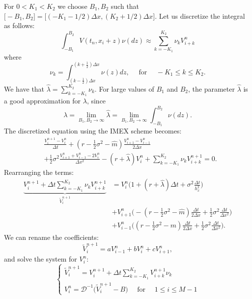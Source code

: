 For $0 < K_1 < K_2$ we choose $B_1,B_2$ such that $ \bigl[-B_1,B_2\bigr] = \bigl[ ( -K_1-1/2 )\Delta x , ( K_2+1/2 )\Delta x \bigr] $.
Let us discretize the integral as follows:
\begin{equation}\label{trap_quad}
 \int_{-B_1}^{B_2}  V(t_n,x_i+z) \nu(dz) \approx \sum_{k = -K_1}^{K_2} \nu_k V^{n}_{i+k}
\end{equation}
where
\begin{equation}\label{nu1}
 \nu_k = \int_{(k-\frac{1}{2}) \Delta x}^{(k+\frac{1}{2}) \Delta x} \nu(z) dz, \hspace{1em} \mbox{ for } \hspace{1em} -K_1 \leq k \leq K_2. 
\end{equation}
We have that $ \hat \lambda = \sum_{k = -K_1}^{K_2} \nu_k $. For large values of $B_1$ and $B_2$, the parameter $\hat \lambda$ is a good approximation for $\lambda$, since
$$\lambda = \lim_{B_1,B_2 \to \infty} \hat \lambda = \lim_{B_1,B_2 \to \infty} \int_{-B_1}^{B_2} \nu(dz).$$
The discretized equation using the IMEX scheme becomes: 
\begin{align}
&\frac{V^{n+1}_{i} -V^{n}_{i}}{\Delta t} + 
(r-\frac{1}{2}\sigma^2 - \hat m) \frac{V^{n}_{i+1} -V^{n}_{i-1}}{ 2 \Delta x} \\ \nonumber
&+ \frac{1}{2} \sigma^2 \frac{V^{n}_{i+1} + V^{n}_{i-1} - 2 V^{n}_{i}}{\Delta x^2}  - (r+\hat \lambda) V^{n}_i +\sum_{k = -K_1}^{K_2} \nu_k V^{n+1}_{i+k} = 0.
\end{align}
Rearranging the terms: 
\begin{align*}
\underbrace{ V^{n+1}_{i} + \Delta t \sum_{k = -K_1}^{K_2} \nu_k V^{n+1}_{i+k} }_{\tilde V^{n+1}_i} &= 
	V^{n}_{i} \biggl( 1 + (r+\hat \lambda)\Delta t + \sigma^2 \frac{\Delta t}{h_x^2} \biggr)  \\
& + V^{n}_{i+1} \biggl( -(r -\frac{1}{2}\sigma^2 -\hat m )\frac{\Delta t}{2 \Delta x} +
\frac{1}{2}\sigma^2 \frac{\Delta t}{\Delta x^2}  \biggr)  \\
& + V^{n}_{i-1} \biggl( (r -\frac{1}{2}\sigma^2 - \hat m)\frac{\Delta t}{2 \Delta x} + 
\frac{1}{2}\sigma^2 \frac{\Delta t}{\Delta x^2}  \biggr).
\end{align*}
We can rename the coefficients:
$$ \tilde V^{n+1}_{i} = a V^{n}_{i-1} + b V^{n}_{i} + c V^{n}_{i+1}, $$
and solve the system for $V^{n}_{i}$:
\begin{equation*}
 \begin{cases}
  \tilde V^{n+1}_i = V^{n+1}_{i} + \Delta t \sum_{k = -K_1}^{K_2} V^{n+1}_{i+k} \nu_k \\
  V^{n}_{i} = \mathcal{D}^{-1} \biggl( \tilde V^{n+1}_{i} - B \biggr) \quad \mbox{ for } \quad 1 \leq i \leq M-1  
 \end{cases}
\end{equation*}
